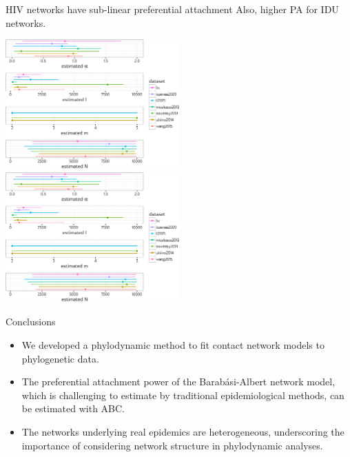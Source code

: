 \documentclass{beamer}
\begin{document}
\begin{frame}{HIV networks have sub-linear preferential attachment}
    Also, higher PA for IDU networks.

    \includegraphics[trim=0 3.5in 3.3in 0, clip, width=0.5\textwidth]{realdata-hpd-bc}
    \includegraphics[trim=3.4in 1.5in 0 2.0in, clip, width=0.5\textwidth]{realdata-hpd-bc}
\end{frame}

\begin{frame}{Conclusions}
  \begin{itemize}
    \item We developed a phylodynamic method to fit contact network models to
      phylogenetic data.
      \pause
    \item The preferential attachment power of the Barab\'asi-Albert network
      model, which is challenging to estimate by traditional epidemiological
      methods, can be estimated with ABC.
      \pause
    \item The networks underlying real epidemics are heterogeneous,
      underscoring the importance of considering network structure in
      phylodynamic analyses.
  \end{itemize}
\end{frame}
\end{document}
